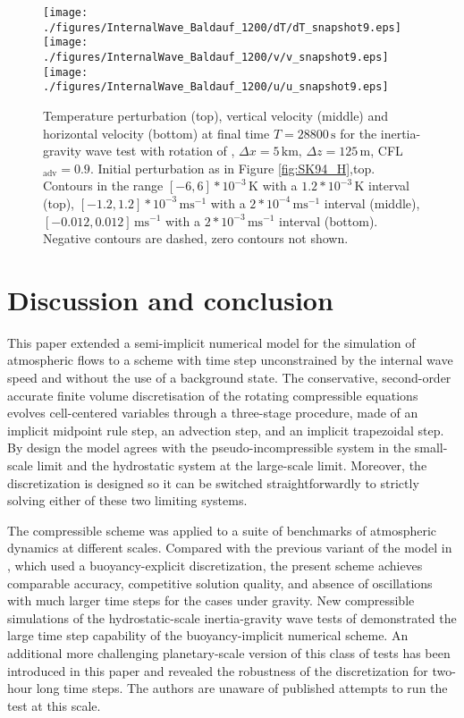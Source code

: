 \documentclass{ametsoc}
\theoremstyle{definition}
\begin{document}
\begin{figure}
\centering
 \texttt{[image: ./figures/InternalWave\_Baldauf\_1200/dT/dT\_snapshot9.eps]}
 \texttt{[image: ./figures/InternalWave\_Baldauf\_1200/v/v\_snapshot9.eps]}
 \texttt{[image: ./figures/InternalWave\_Baldauf\_1200/u/u\_snapshot9.eps]}
 \caption{Temperature perturbation (top), vertical velocity (middle) and horizontal velocity (bottom) at final time $T=28800\,\textrm{s}$ for the inertia-gravity wave test with rotation of \cite{BaldaufBrdar2013}, $\Delta x=5\,\textrm{km},\,\Delta z=125\,\textrm{m}$, CFL$_\textrm{adv}=0.9$. Initial perturbation as in Figure \ref{fig:SK94_H},top. Contours in the range $[-6, 6]*10^{-3}\,\textrm{K}$ with a $1.2*10^{-3}\,\textrm{K}$ interval (top), $[-1.2, 1.2]*10^{-3}\,\textrm{ms$^{-1}$}$  with a $2*10^{-4}\,\textrm{ms$^{-1}$}$ interval (middle), $[-0.012, 0.012]\,\textrm{ms$^{-1}$}$ with a $2*10^{-3}\,\textrm{ms$^{-1}$}$ interval (bottom). Negative contours are dashed, zero contours not shown.}
  \label{fig:BB13}
\end{figure}

\section{Discussion and conclusion}
\label{sec:Conclusions}	

This paper extended a semi-implicit numerical model for the simulation of atmospheric flows to a scheme with time step unconstrained by the internal wave speed and without the use of a background state. The conservative, second-order accurate finite volume discretisation of the rotating compressible equations evolves cell-centered variables through a three-stage procedure, made of an implicit midpoint rule step, an advection step, and an implicit trapezoidal step. By design the model agrees with the pseudo-incompressible system in the small-scale limit and the hydrostatic system at the large-scale limit. Moreover, the discretization is designed so it can be switched straightforwardly to strictly solving either of these two limiting systems.

The compressible scheme was applied to a suite of benchmarks of atmospheric dynamics at different scales. Compared with the previous variant of the model in \citep{Benacchio2014, BenacchioEtAl2014}, which used a buoyancy-explicit discretization, the present scheme achieves comparable accuracy, competitive solution quality, and absence of oscillations with much larger time steps for the cases under gravity. New compressible simulations of the hydrostatic-scale inertia-gravity wave tests of \citet{SkamarockKlemp1994} demonstrated the large time step capability of the buoyancy-implicit numerical scheme. An additional more challenging planetary-scale version of this class of tests has been introduced in this paper and revealed the robustness of the discretization for two-hour long time steps. The authors are unaware of published attempts to run the test at this scale. 
\end{document}
